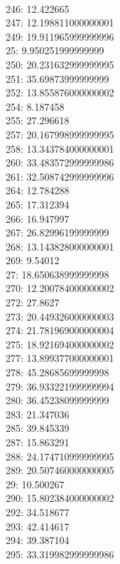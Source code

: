 \begin{multicols}{4}
  \\ 246: 12.422665
  \\ 247: 12.198811000000001
  \\ 249: 19.911965999999996
  \\ 25: 9.950251999999999
  \\ 250: 20.231632999999995
  \\ 251: 35.69873999999999
  \\ 252: 13.855876000000002
  \\ 254: 8.187458
  \\ 255: 27.296618
  \\ 257: 20.167998999999995
  \\ 258: 13.343784000000001
  \\ 260: 33.483572999999986
  \\ 261: 32.508742999999996
  \\ 264: 12.784288
  \\ 265: 17.312394
  \\ 266: 16.947997
  \\ 267: 26.82996199999999
  \\ 268: 13.143828000000001
  \\ 269: 9.54012
  \\ 27: 18.650638999999998
  \\ 270: 12.200784000000002
  \\ 272: 27.8627
  \\ 273: 20.449326000000003
  \\ 274: 21.781969000000004
  \\ 275: 18.921694000000002
  \\ 277: 13.899377000000001
  \\ 278: 45.28685699999998
  \\ 279: 36.933221999999994
  \\ 280: 36.45238099999999
  \\ 283: 21.347036
  \\ 285: 39.845339
  \\ 287: 15.863291
  \\ 288: 24.174710999999995
  \\ 289: 20.507460000000005
  \\ 29: 10.500267
  \\ 290: 15.802384000000002
  \\ 292: 34.518677
  \\ 293: 42.414617
  \\ 294: 39.387104
  \\ 295: 33.319982999999986

\end{multicols}
